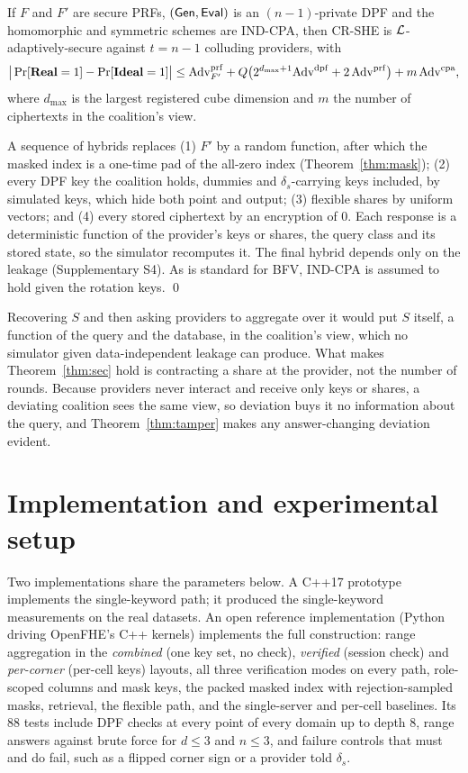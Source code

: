 \begin{theorem}
\label{thm:sec}
If $F$ and $F'$ are secure PRFs, $(\mathsf{Gen},\mathsf{Eval})$ is an $(n{-}1)$-private DPF and
the homomorphic and symmetric schemes are IND-CPA, then CR-SHE is
$\mathcal{L}$-adaptively-secure against $t=n-1$ colluding providers, with
\[
\big|\Pr[\mathbf{Real}=1]-\Pr[\mathbf{Ideal}=1]\big|\le\mathrm{Adv}^{\mathrm{prf}}_{F'}
+Q\big(2^{d_{\max}+1}\mathrm{Adv}^{\mathrm{dpf}}+2\,\mathrm{Adv}^{\mathrm{prf}}\big)+m\,\mathrm{Adv}^{\mathrm{cpa}} ,
\]
where $d_{\max}$ is the largest registered cube dimension and $m$ the number of
ciphertexts in the coalition's view.
\end{theorem}
\begin{pf}
A sequence of hybrids replaces (1) $F'$ by a random function, after which the
masked index is a one-time pad of the all-zero index (Theorem~\ref{thm:mask});
(2) every DPF key the coalition holds, dummies and $\delta_s$-carrying keys
included, by simulated keys, which hide both point and output; (3) flexible
shares by uniform vectors; and (4) every stored ciphertext by an encryption of
$0$. Each response is a deterministic function of the provider's keys or shares,
the query class and its stored state, so the simulator recomputes it. The final
hybrid depends only on the leakage (Supplementary S4). As is standard for BFV,
IND-CPA is assumed to hold given the rotation keys. \qed
\end{pf}

Recovering $S$ and then asking providers to aggregate over it would put $S$
itself, a function of the query and the database, in the coalition's view,
which no simulator given data-independent leakage can produce. What makes
Theorem~\ref{thm:sec} hold is contracting a share at the provider, not the
number of rounds. Because providers never interact and receive only keys or
shares, a deviating coalition sees the same view, so deviation buys it no
information about the query, and Theorem~\ref{thm:tamper} makes any
answer-changing deviation evident.

\section{Implementation and experimental setup}
\label{sec:impl}
Two implementations share the parameters below. A C++17 prototype implements
the single-keyword path; it produced the single-keyword measurements on the
real datasets. An open reference implementation (Python driving OpenFHE's C++
kernels) implements the full construction: range aggregation in the
\emph{combined} (one key set, no check), \emph{verified} (session check) and
\emph{per-corner} (per-cell keys) layouts, all three verification modes on
every path, role-scoped columns and mask keys, the packed masked index with
rejection-sampled masks, retrieval, the flexible path, and the single-server
and per-cell baselines. Its 88 tests include DPF checks at every point of every domain up to
depth 8, range answers against brute force for $d\le3$ and $n\le3$, and failure
controls that must and do fail, such as a flipped corner sign or a provider
told $\delta_s$.

